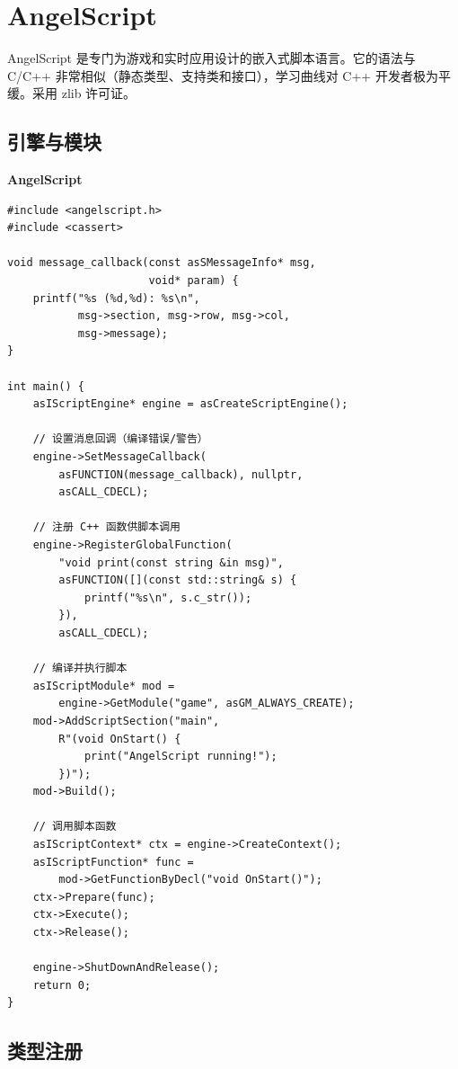 \documentclass[12pt,a4paper,fontset=fandol]{ctexbook}
\newcommand{\angelscriptlabel}{%
  \noindent\begin{tcolorbox}[colback=angelscriptbg,coltext=white,
    sharp corners,boxrule=0pt,width=6.5em,height=1.4em,
    halign=center,valign=center,nobeforeafter,left=0pt,right=0pt,
    top=0pt,bottom=0pt]\small\bfseries AngelScript\end{tcolorbox}}
\begin{document}
\chapter{AngelScript}\label{ch:angelscript}

AngelScript 是专门为游戏和实时应用设计的嵌入式脚本语言。它的语法与 C/C++ 非常相似（静态类型、支持类和接口），学习曲线对 C++ 开发者极为平缓。采用 zlib 许可证。

\section{引擎与模块}\label{sec:as-engine}

\angelscriptlabel
\begin{lstlisting}[style=cppstyle]
#include <angelscript.h>
#include <cassert>

void message_callback(const asSMessageInfo* msg,
                      void* param) {
    printf("%s (%d,%d): %s\n",
           msg->section, msg->row, msg->col,
           msg->message);
}

int main() {
    asIScriptEngine* engine = asCreateScriptEngine();

    // 设置消息回调（编译错误/警告）
    engine->SetMessageCallback(
        asFUNCTION(message_callback), nullptr,
        asCALL_CDECL);

    // 注册 C++ 函数供脚本调用
    engine->RegisterGlobalFunction(
        "void print(const string &in msg)",
        asFUNCTION([](const std::string& s) {
            printf("%s\n", s.c_str());
        }),
        asCALL_CDECL);

    // 编译并执行脚本
    asIScriptModule* mod =
        engine->GetModule("game", asGM_ALWAYS_CREATE);
    mod->AddScriptSection("main",
        R"(void OnStart() {
            print("AngelScript running!");
        })");
    mod->Build();

    // 调用脚本函数
    asIScriptContext* ctx = engine->CreateContext();
    asIScriptFunction* func =
        mod->GetFunctionByDecl("void OnStart()");
    ctx->Prepare(func);
    ctx->Execute();
    ctx->Release();

    engine->ShutDownAndRelease();
    return 0;
}
\end{lstlisting}

\section{类型注册}\label{sec:as-type-reg}
\end{document}
